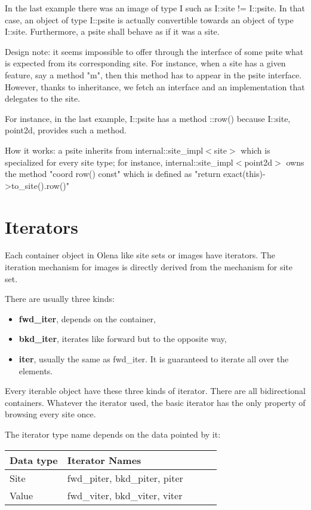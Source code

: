 \documentclass{report}
\begin{document}
In the last example there was an image of type I such as I::site != I::psite. 
In that case, an object of type I::psite is actually convertible towards an
object of type I::site.  Furthermore, a psite shall behave as if it was a
site.

Design note: it seems impossible to offer through the interface of
some psite what is expected from its corresponding site.  For instance, when a
site has a given feature, say a method "m", then this
method has to appear in the psite interface. However, thanks to
inheritance, we fetch an interface and an implementation that delegates
to the site.

For instance, in the last example, I::psite has a method ::row() because
I::site, point2d, provides such a method.

How it works: a psite inherits from internal::site\_impl$<$site$>$ which is
specialized for every site type; for instance, internal::site\_impl$<$point2d$>$
owns the method "coord row() const" which is defined as
"return exact(this)->to\_site().row()"


\chapter{Iterators}

Each container object in Olena like site sets or images have iterators.
The iteration mechanism for images is directly derived from the mechanism
for site set.

There are usually three kinds:
\begin{itemize}
\item \textbf{fwd\_iter}, depends on the container,
\item \textbf{bkd\_iter}, iterates like forward but to the opposite way,
\item \textbf{iter}, usually the same as fwd\_iter. It is guaranteed to
iterate all over the elements.
\end{itemize}
Every iterable object have these three kinds of iterator. There are all
bidirectional containers.
Whatever the iterator used, the basic iterator has the only property of
browsing every site once.

The iterator type name depends on the data pointed by it: \\

\begin{tabular}{|l|l|l|l|p{4cm}|}
\hline
Data type & Iterator Names \\ \hline
Site & fwd\_piter, bkd\_piter, piter \\ \hline
Value & fwd\_viter, bkd\_viter, viter \\ \hline
\end{tabular} \\
\end{document}
